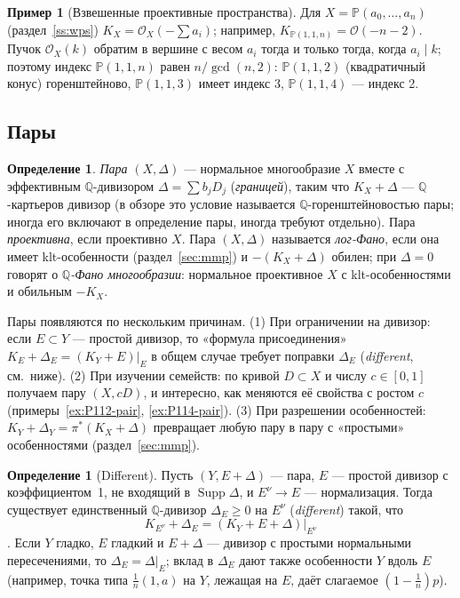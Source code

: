 \documentclass[11pt,a4paper]{article}
\theoremstyle{plain}
\theoremstyle{definition}
\newtheorem{definition}[theorem]{Определение}
\newtheorem{example}[theorem]{Пример}
\theoremstyle{remark}
\newcommand{\Q}{\mathbb{Q}}
\newcommand{\PP}{\mathbb{P}}
\newcommand{\cO}{\mathcal{O}}
\DeclareMathOperator{\Supp}{Supp}
\begin{document}
\begin{example}[Взвешенные проективные пространства]
Для $X=\PP(a_0,\dots,a_n)$ (раздел~\ref{ss:wps}) $K_X=\cO_X(-\sum a_i)$; например,
$K_{\PP(1,1,n)}=\cO(-n-2)$. Пучок $\cO_X(k)$ обратим в вершине с весом $a_i$ тогда и только тогда,
когда $a_i\mid k$; поэтому индекс $\PP(1,1,n)$ равен $n/\gcd(n,2)$: $\PP(1,1,2)$ (квадратичный
конус) горенштейново, $\PP(1,1,3)$ имеет индекс 3, $\PP(1,1,4)$ --- индекс 2.
\end{example}

\subsection{Пары}

\begin{definition}\label{def:pair}
\emph{Пара} $(X,\Delta)$ --- нормальное многообразие $X$ вместе с эффективным $\Q$-дивизором
$\Delta=\sum b_jD_j$ (\emph{границей}), таким что $K_X+\Delta$ --- $\Q$-картьеров дивизор
(в обзоре это условие называется $\Q$-горенштейновостью пары; иногда его включают в определение
пары, иногда требуют отдельно). Пара \emph{проективна}, если проективно $X$. Пара $(X,\Delta)$
называется \emph{лог-Фано}, если она имеет klt-особенности (раздел~\ref{sec:mmp}) и
$-(K_X+\Delta)$ обилен; при $\Delta=0$ говорят о \emph{$\Q$-Фано многообразии}: нормальное
проективное $X$ с klt-особенностями и обильным $-K_X$.
\end{definition}

Пары появляются по нескольким причинам. (1) При ограничении на дивизор: если $E\subset Y$ ---
простой дивизор, то «формула присоединения» $K_E+\Delta_E=(K_Y+E)|_E$ в общем случае требует
поправки $\Delta_E$ (\emph{different}, см.~ниже). (2) При изучении семейств: по кривой $D\subset X$
и числу $c\in[0,1]$ получаем пару $(X,cD)$, и интересно, как меняются её свойства с ростом $c$
(примеры~\ref{ex:P112-pair}, \ref{ex:P114-pair}). (3) При разрешении особенностей:
$K_Y+\Delta_Y=\pi^*(K_X+\Delta)$ превращает любую пару в пару с «простыми» особенностями
(раздел~\ref{sec:mmp}).

\begin{definition}[Different]\label{def:different}
Пусть $(Y,E+\Delta)$ --- пара, $E$ --- простой дивизор с коэффициентом~1, не входящий в
$\Supp\Delta$, и $E^\nu\to E$ --- нормализация. Тогда существует единственный $\Q$-дивизор
$\Delta_E\ge0$ на $E^\nu$ (\emph{different}) такой, что
\[
K_{E^\nu}+\Delta_E=(K_Y+E+\Delta)|_{E^\nu}
\]
\cite[4.2]{KolSing}. Если $Y$ гладко, $E$ гладкий и $E+\Delta$ --- дивизор с простыми нормальными
пересечениями, то $\Delta_E=\Delta|_E$; вклад в $\Delta_E$ дают также особенности $Y$ вдоль $E$
(например, точка типа $\frac1n(1,a)$ на $Y$, лежащая на $E$, даёт слагаемое $(1-\frac1n)p$).
\end{definition}
\end{document}
